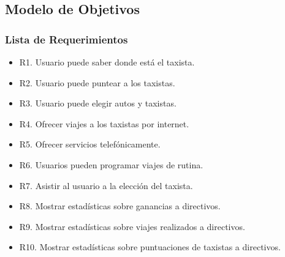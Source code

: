 \subsection{Modelo de Objetivos}
\subsubsection{Lista de Requerimientos}
	\begin{itemize}
		\item R1. Usuario puede saber donde está el taxista.
		\item R2. Usuario puede puntear a los taxistas.
		\item R3. Usuario puede elegir autos y taxistas.
		\item R4. Ofrecer viajes a los taxistas por internet.
		\item R5. Ofrecer servicios telefónicamente.
		\item R6. Usuarios pueden programar viajes de rutina.
		\item R7. Asistir al usuario a la elección del taxista.
		\item R8. Mostrar estadísticas sobre ganancias a directivos.
		\item R9. Mostrar estadísticas sobre viajes realizados a directivos.
		\item R10. Mostrar estadísticas sobre puntuaciones de taxistas a directivos.
	
	\end{itemize}
